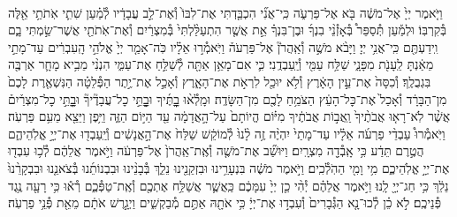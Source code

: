 \documentclass[twoside, openany, parskip=half, 11pt]{book}
\begin{document}
\begin{footnotesize}
\begin{multicols}{2}
\\
וַיֹּ֤אמֶר יְיָ֙ אֶל־מֹשֶׁ֔ה בֹּ֖א אֶל־פַּרְעֹ֑ה כִּֽי־אֲנִ֞י הִכְבַּ֤דְתִּי אֶת־לִבּוֹ֙ וְ֯אֶת־לֵ֣ב עֲבָדָ֔יו לְ֯מַ֗עַן שִׁתִ֛י אֹֽתֹתַ֥י אֵ֖לֶּה בְּ֯קִרְבּֽוֹ׃ וּלְמַ֡עַן תְּ֯סַפֵּר֩ בְּ֯אָזְ֯נֵ֨י בִנְךָ֜ וּבֶן־בִּנְךָ֗ אֵ֣ת אֲשֶׁ֤ר הִתְעַלַּ֨לְתִּי֙ בְּ֯מִצְרַ֔יִם וְ֯אֶת־אֹֽתֹתַ֖י אֲשֶׁר־שַׂ֣מְתִּי בָ֑ם וִֽידַעְתֶּ֖ם כִּֽי־אֲנִ֥י יְיָ׃ וַיָּבֹ֨א מֹשֶׁ֣ה וְ֯אַֽהֲרֹן֘ אֶל־פַּרְעֹה֒ וַיֹּֽאמְ֯ר֣וּ אֵלָ֗יו כֹּֽה־אָמַ֤ר יְיָ֙ אֱלֹהֵ֣י הָֽעִבְרִ֔ים עַד־מָתַ֣י מֵאַ֔נְתָּ לֵֽעָנֹ֖ת מִפָּנָ֑י שַׁלַּ֥ח עַמִּ֖י וְ֯יַֽעַבְדֻֽנִי׃  כִּ֛י אִם־מָאֵ֥ן אַתָּ֖ה לְ֯שַׁלֵּ֣חַ אֶת־עַמִּ֑י הִנְנִ֨י מֵבִ֥יא מָחָ֛ר אַרְבֶּ֖ה בִּגְבֻלֶֽךָ׃ וְ֯כִסָּה֙ אֶת־עֵ֣ין הָאָ֔רֶץ וְ֯לֹ֥א יוּכַ֖ל לִרְאֹ֣ת אֶת־הָאָ֑רֶץ וְ֯אָכַ֣ל אֶת־יֶ֣תֶר הַפְּ֯לֵטָ֗ה הַנִּשְׁאֶ֤רֶת לָכֶם֙ מִן־הַבָּרָ֔ד וְ֯אָכַל֙ אֶת־כׇּל־הָעֵ֔ץ הַצֹּמֵ֥חַ לָכֶ֖ם מִן־הַשָּׂדֶֽה׃ וּמָֽלְ֯א֨וּ בׇׇׇׇׇׇׇׇׇׇתֶּ֜יךָ וּבׇׇׇׇׇׇתֵּ֣י כׇל־עֲבָדֶ֘יךָ֘ וּבׇׇׇׇׇׇתֵּ֣י כׇל־מִצְרַ֒יִם֒ אֲשֶׁ֨ר לֹֽא־רָא֤וּ אֲבֹתֶ֨יךָ֙ וַֽאֲב֣וֹת אֲבֹתֶ֔יךָ מִיּ֗וֹם הֱיוֹתָם֙ עַל־הָ֣אֲדָמָ֔ה עַ֖ד הַיּ֣וֹם הַזֶּ֑ה וַיִּ֥פֶן וַיֵּצֵ֖א מֵעִ֥ם פַּרְעֹֽה׃  וַיֹּֽאמְ֯רוּ֩ עַבְדֵ֨י פַרְעֹ֜ה אֵלָ֗יו עַד־מָתַי֙ יִהְיֶ֨ה זֶ֥ה לָ֨נוּ֙ לְ֯מוֹקֵ֔שׁ שַׁלַּח֙ אֶת־הָ֣אֲנָשִׁ֔ים וְ֯יַֽעַבְד֖וּ אֶת־יְיָ֣ אֱלֹֽהֵיהֶ֑ם הֲטֶ֣רֶם תֵּדַ֔ע כִּ֥י אָֽבְ֯דָ֖ה מִצְרָֽיִם׃ וַיּוּשַׁ֞ב אֶת־מֹשֶׁ֤ה וְ֯אֶֽת־אַֽהֲרֹן֙ אֶל־פַּרְעֹ֔ה וַיֹּ֣אמֶר אֲלֵהֶ֔ם לְ֯כ֥וּ עִבְד֖וּ אֶת־יְיָ֣ אֱלֹֽהֵיכֶ֑ם מִ֥י וָמִ֖י הַהֹֽלְ֯כִֽים׃ וַיֹּ֣אמֶר מֹשֶׁ֔ה בִּנְעָרֵ֥ינוּ וּבִזְקֵנֵ֖ינוּ נֵלֵ֑ךְ בְּ֯בָנֵ֨ינוּ וּבִבְנוֹתֵ֜נוּ בְּ֯צֹאנֵ֤נוּ וּבִבְקָרֵ֨נוּ֙ נֵלֵ֔ךְ כִּ֥י חַג־יְיָ֖ לָֽנוּ׃ וַיֹּ֣אמֶר אֲלֵהֶ֗ם יְ֯הִ֨י כֵ֤ן יְיָ֙ עִמָּכֶ֔ם כַּֽאֲשֶׁ֛ר אֲשַׁלַּ֥ח אֶתְכֶ֖ם וְ֯אֶֽת־טַפְּ֯כֶ֑ם רְ֯א֕וּ כִּ֥י רָעָ֖ה נֶ֥גֶד פְּ֯נֵיכֶֽם׃ לֹ֣א כֵ֗ן לְ֯כוּ־נָ֤א הַגְּ֯בָרִים֙ וְ֯עִבְד֣וּ אֶת־יְיָ֔ כִּ֥י אֹתָ֖הּ אַתֶּ֣ם מְ֯בַקְשִׁ֑ים וַיְגָ֣רֶשׁ אֹתָ֔ם מֵאֵ֖ת פְּ֯נֵ֥י פַרְעֹֽה׃



\end{multicols}
\end{footnotesize}
\end{document}
